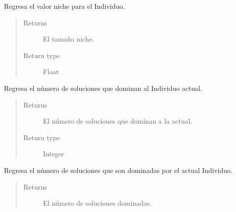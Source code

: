 \documentclass[letterpaper,10pt,english]{sphinxmanual}
\begin{document}
\begin{fulllineitems}
\begin{fulllineitems}
\end{fulllineitems}


\begin{fulllineitems}
\label{Model/Community/Population/Individual/Individual:Model.Community.Population.Individual.Individual.Individual.get_niche_count}
Regresa el valor niche para el Individuo.
\begin{quote}\begin{description}
\item[{Returns}] \leavevmode
El tamaño niche.

\item[{Return type}] \leavevmode
Float

\end{description}\end{quote}

\end{fulllineitems}


\begin{fulllineitems}
\label{Model/Community/Population/Individual/Individual:Model.Community.Population.Individual.Individual.Individual.get_pareto_dominated}
Regresa el número de soluciones que dominan al 
Individuo actual.
\begin{quote}\begin{description}
\item[{Returns}] \leavevmode
El número de soluciones que dominan a la actual.

\item[{Return type}] \leavevmode
Integer

\end{description}\end{quote}

\end{fulllineitems}


\begin{fulllineitems}
\label{Model/Community/Population/Individual/Individual:Model.Community.Population.Individual.Individual.Individual.get_pareto_dominates}
Regresa el número de soluciones que son dominadas por 
el actual Individuo.
\begin{quote}\begin{description}
\item[{Returns}] \leavevmode
El número de soluciones dominadas.


\end{description}
\end{quote}
\end{fulllineitems}
\end{fulllineitems}
\end{document}
